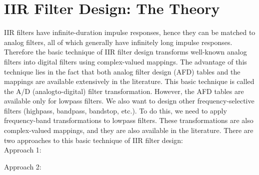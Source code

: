 \documentclass{article}
\begin{document}
\section{IIR Filter Design: The Theory}
IIR filters have infinite-duration impulse responses, hence they can be
matched to analog filters, all of which generally have infinitely long impulse responses. Therefore the basic technique of IIR filter design transforms well-known analog filters into digital filters using complex-valued
mappings. The advantage of this technique lies in the fact that both
analog filter design (AFD) tables and the mappings are available extensively in the literature. This basic technique is called the A/D (analogto-digital) filter transformation. However, the AFD tables are available
only for lowpass filters. We also want to design other frequency-selective
filters (highpass, bandpass, bandstop, etc.). To do this, we need to apply
frequency-band transformations to lowpass filters. These transformations
are also complex-valued mappings, and they are also available in the literature. There are two approaches to this basic technique of IIR filter design: \\
\vspace{1em}
Approach 1: \\
\vspace{1em}

Approach 2: \\
\vspace{1em}
\end{document}
